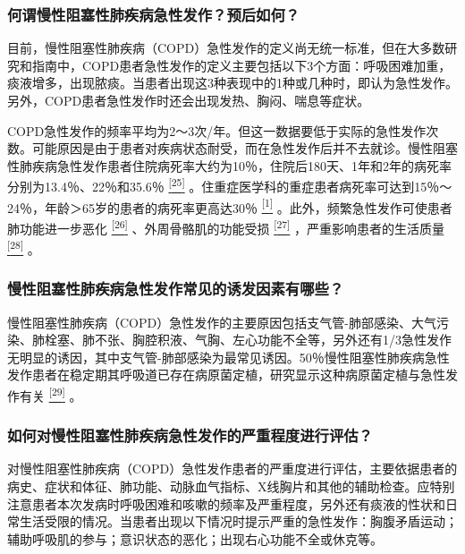 \subsubsection{何谓慢性阻塞性肺疾病急性发作？预后如何？}

目前，慢性阻塞性肺疾病（COPD）急性发作的定义尚无统一标准，但在大多数研究和指南中，COPD患者急性发作的定义主要包括以下3个方面：呼吸困难加重，痰液增多，出现脓痰。当患者出现这3种表现中的1种或几种时，即认为急性发作。另外，COPD患者急性发作时还会出现发热、胸闷、喘息等症状。

COPD急性发作的频率平均为2～3次/年。但这一数据要低于实际的急性发作次数。可能原因是由于患者对疾病状态耐受，而在急性发作后并不去就诊。慢性阻塞性肺疾病急性发作患者住院病死率大约为10％，住院后180天、1年和2年的病死率分别为13.4％、22％和35.6％
\protect\hyperlink{text00012.htmlux5cux23ch25-11}{\textsuperscript{{[}25{]}}}
。住重症医学科的重症患者病死率可达到15％～24％，年龄＞65岁的患者的病死率更高达30％
\protect\hyperlink{text00012.htmlux5cux23ch1-11}{\textsuperscript{{[}1{]}}}
。此外，频繁急性发作可使患者肺功能进一步恶化
\protect\hyperlink{text00012.htmlux5cux23ch26-11}{\textsuperscript{{[}26{]}}}
、外周骨骼肌的功能受损
\protect\hyperlink{text00012.htmlux5cux23ch27-11}{\textsuperscript{{[}27{]}}}
，严重影响患者的生活质量
\protect\hyperlink{text00012.htmlux5cux23ch28-11}{\textsuperscript{{[}28{]}}}
。

\subsubsection{慢性阻塞性肺疾病急性发作常见的诱发因素有哪些？}

慢性阻塞性肺疾病（COPD）急性发作的主要原因包括支气管-肺部感染、大气污染、肺栓塞、肺不张、胸腔积液、气胸、左心功能不全等，另外还有1/3急性发作无明显的诱因，其中支气管-肺部感染为最常见诱因。50％慢性阻塞性肺疾病急性发作患者在稳定期其呼吸道已存在病原菌定植，研究显示这种病原菌定植与急性发作有关
\protect\hyperlink{text00012.htmlux5cux23ch29-11}{\textsuperscript{{[}29{]}}}
。

\subsubsection{如何对慢性阻塞性肺疾病急性发作的严重程度进行评估？}

对慢性阻塞性肺疾病（COPD）急性发作患者的严重度进行评估，主要依据患者的病史、症状和体征、肺功能、动脉血气指标、X线胸片和其他的辅助检查。应特别注意患者本次发病时呼吸困难和咳嗽的频率及严重程度，另外还有痰液的性状和日常生活受限的情况。当患者出现以下情况时提示严重的急性发作：胸腹矛盾运动；辅助呼吸肌的参与；意识状态的恶化；出现右心功能不全或休克等。

